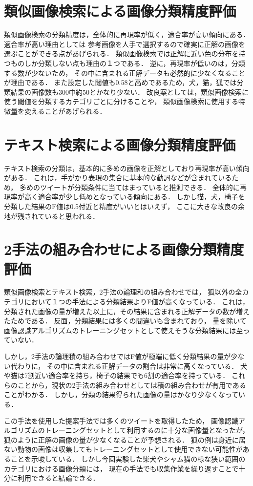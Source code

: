 \section{類似画像検索による画像分類精度評価}
類似画像検索の分類精度は，全体的に再現率が低く，適合率が高い傾向にある．
適合率が高い理由としては
参考画像を人手で選択するので確実に正解の画像を選ぶことができる点があげられる．
類似画像検索では正解に近い色の分布を持つものしか分類しない点も理由の１つである．
逆に，再現率が低いのは，分類する数が少ないため，
その中に含まれる正解データも必然的に少なくなることが理由である．
また設定した閾値も0.58と高めであるため，犬，猫，狐では分類結果の画像数も300中約50とかなり少ない．
改良案としては，類似画像検索に使う閾値を分類するカテゴリごとに分けることや，
類似画像検索に使用する特徴量を変えることがあげられる．

\section{テキスト検索による画像分類精度評価}

テキスト検索の分類は，基本的に多めの画像を正解としており再現率が高い傾向がある．
これは，手がかり表現の集合に基本的な動詞などが含まれているため，
多めのツイートが分類条件に当てはまっていると推測できる．
全体的に再現率が高く適合率が少し低めとなっている傾向にある．
しかし猫，犬，椅子を分類した結果のF値は0.5付近と精度がいいとはいえず，
ここに大きな改良の余地が残されていると思われる．

\section{2手法の組み合わせによる画像分類精度評価}
類似画像検索とテキスト検索，2手法の論理和の組み合わせでは，
狐以外の全カテゴリにおいて１つの手法による分類結果よりF値が高くなっている．
これは，分類された画像の量が増えた以上に，その結果に含まれる正解データの数が増えたためである．
反面，分類結果には多くの間違いも含まれており，
量を除いて画像認識アルゴリズムのトレーニングセットとして使えそうな分類結果には至っていない．

しかし，2手法の論理積の組み合わせではF値が極端に低く分類結果の量が少ない代わりに，
その中に含まれる正解データの割合は非常に高くなっている．
犬や猫は7割近い適合率を持ち，椅子の結果でも6割の適合率を持っている．
これらのことから，現状の2手法の組み合わせとしては積の組み合わせが有用であることがわかる．
しかし，分類の結果得られた画像の量はかなり少なくなっている．

この手法を使用した提案手法では多くのツイートを取得したため，
画像認識アルゴリズムのトレーニングセットとして利用するのに十分な画像量となったが，
狐のように正解の画像の量が少なくなることが予想される．
狐の例は身近に居ない動物の画像は収集してもトレーニングセットとして使用できない可能性があることを示唆している．
しかし今回実験した柴犬やシャム猫の様な狭い範囲のカテゴリにおける画像分類には，
現在の手法でも収集作業を繰り返すことで十分に利用できると結論できる．
